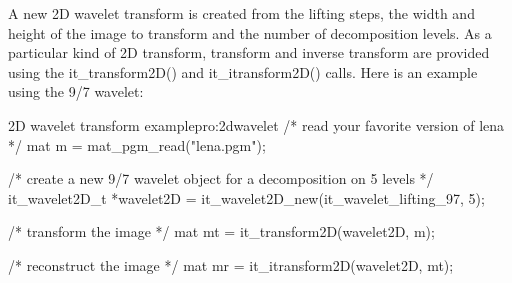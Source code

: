      A new 2D wavelet transform is created from the lifting steps, the
width and height of the image to transform and the number of
decomposition levels. As a particular kind of 2D transform, transform
and inverse transform are provided using the it\_transform2D() and
it\_itransform2D() calls. Here is an example using the 9/7 wavelet:

\begin{program}{2D wavelet transform example}{pro:2dwavelet}
  /* read your favorite version of lena */
  mat m = mat_pgm_read("lena.pgm");

  /* create a new 9/7 wavelet object for a decomposition on 5 levels */
  it_wavelet2D_t *wavelet2D = it_wavelet2D_new(it_wavelet_lifting_97, 5);

  /* transform the image */
  mat mt = it_transform2D(wavelet2D, m);

  /* reconstruct the image */
  mat mr = it_itransform2D(wavelet2D, mt);
\end{program}